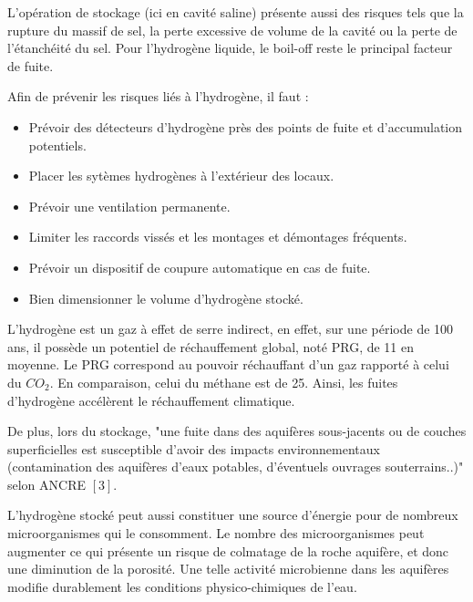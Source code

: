 \documentclass[11pt,french,a4paper]{article}
\begin{document}
\begin{multicols}{2}
L'opération de stockage (ici en cavité saline) présente aussi des risques tels que la rupture du massif de sel, la perte excessive de volume de la cavité ou la perte de l'étanchéité du sel. Pour l'hydrogène liquide, le boil-off reste le principal facteur de fuite. \cite{ADEME_2022}

Afin de prévenir les risques liés à l'hydrogène, il faut :
\begin{itemize}
\item Prévoir des détecteurs d'hydrogène près des points de fuite et d'accumulation potentiels.
\item Placer les sytèmes hydrogènes à l'extérieur des locaux.
\item Prévoir une ventilation permanente.
\item Limiter les raccords vissés et les montages et démontages fréquents.
\item Prévoir un dispositif de coupure automatique en cas de fuite.
\item Bien dimensionner le volume d'hydrogène stocké.
\end{itemize}

L'hydrogène est un gaz à effet de serre indirect, en effet, sur une période de 100 ans, il possède un potentiel de réchauffement global, noté PRG, de 11 en moyenne. Le PRG correspond au pouvoir réchauffant d'un gaz rapporté à celui du $CO_2$. En comparaison, celui du méthane est de 25. Ainsi, les fuites d'hydrogène accélèrent le réchauffement climatique.

De plus, lors du stockage, "une fuite dans des aquifères sous-jacents ou de couches superficielles est susceptible d'avoir des impacts environnementaux (contamination des aquifères d'eaux potables, d'éventuels ouvrages souterrains..)" selon ANCRE $[3]$.

L'hydrogène stocké peut aussi constituer une source d'énergie pour de nombreux microorganismes qui le consomment. Le nombre des microorganismes peut augmenter ce qui présente un risque de colmatage de la roche aquifère, et donc une diminution de la porosité. Une telle activité microbienne dans les aquifères modifie durablement les conditions physico-chimiques de l'eau.\\


\end{multicols}
\end{document}
